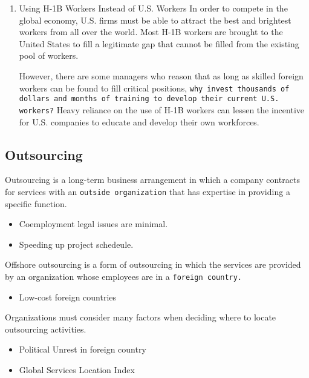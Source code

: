 \documentclass[11pt]{article}
\begin{document}
\begin{enumerate}
\item Using H-1B Workers Instead of U.S. Workers
\label{sec:org32a1119}
In order to compete in the global economy, U.S. firms must be able to attract the best and brightest workers from all over the world. Most H-1B workers are brought to the United States to fill a legitimate gap that cannot be filled from the existing pool of workers.

However, there are some managers who reason that as long as skilled foreign workers can be found to fill critical positions, \texttt{why invest thousands of dollars and months of training to develop their current U.S. workers?} Heavy reliance on the use of H-1B workers can lessen the incentive for U.S. companies to educate and develop their own workforces.
\end{enumerate}

\subsection{Outsourcing}
\label{sec:orgec432b7}
Outsourcing is a long-term business arrangement in which a company contracts for services with an \texttt{outside organization} that has expertise in providing a specific function.

\begin{itemize}
\item Coemployment legal issues are minimal.
\item Speeding up project schedeule.
\end{itemize}

Offshore outsourcing is a form of outsourcing in which the services are provided by an organization whose employees are in a \texttt{foreign country.}
\begin{itemize}
\item Low-cost foreign countries
\end{itemize}

Organizations must consider many factors when deciding where to locate outsourcing activities.
\begin{itemize}
\item Political Unrest in foreign country
\item Global Services Location Index
\end{itemize}
\end{document}
